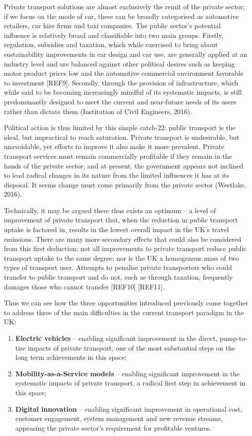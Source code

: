 \documentclass[journal]{IEEEtran}
\begin{document}
Private transport solutions are almost exclusively the remit of the
private sector; if we focus on the mode of car, these can be broadly
categorised as automotive retailers, car hire firms and taxi
companies. The public sector’s potential influence is relatively broad
and classifiable into two main groups. Firstly, regulation, subsidies
and taxation, which while exercised to bring about sustainability
improvements in car design and car use, are generally applied at an
industry level and are balanced against other political desires such
as keeping motor product prices low and the automotive commercial
environment favorable to investment [REF9]. Secondly, through the
provision of infrastructure, which while said to be becoming
increasingly mindful of its systematic impacts, is still predominantly
designed to meet the current and near-future needs of its users rather
than dictate them (Institution of Civil Engineers, 2016). 

Political action is thus limited by this simple catch-22: public
transport is the ideal, but impractical to reach saturation. Private
transport is undesirable, but unavoidable, yet efforts to improve it
also make it more prevalent. Private transport services must remain
commercially profitable if they remain in the hands of the private
sector, and at present, the government appears not inclined to lead
radical changes in its nature from the limited influences it has at
its disposal. It seems change must come primarily from the private
sector (Westlake, 2016).

Technically, it may be argued there thus exists an optimum – a level
of improvement of private transport that, when the reduction in public
transport uptake is factored in, results in the lowest overall impact
in the UK’s travel emissions. There are many more secondary effects
that could also be considered from this first deduction; not all
improvements to private transport reduce public transport uptake to
the same degree; nor is the UK a homogenous mass of two types of
transport user. Attempts to penalise private transporters who could
transfer to public transport and do not, such as through taxation,
frequently damages those who cannot transfer [REF10] [REF11].

Thus we can see how the three opportunities introduced previously come
together to address three of the main difficulties in the current
transport paradigm in the UK:

\begin{enumerate}
\item {\textbf{Electric vehicles}} -- enabling significant improvement
in the direct, pump-to-tire impacts of private transport, one of the
most substantial steps on the long term achievements in this space;
\item {\textbf{Mobility-as-a-Service models}} -- enabling significant
improvement in the systematic impacts of private transport, a radical
first step in achievement in this space;
\item {\textbf{Digital innovation}} -- enabling significant
improvement in operational cost, customer engagement, system
management and new revenue streams, appeasing the private sector's
requirement for profitable ventures.
\end{enumerate}
\end{document}
